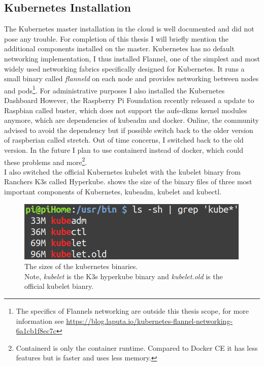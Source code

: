 \subsection{Kubernetes Installation}
The Kubernetes master installation in the cloud is well documented and did not pose any trouble. For completion of this thesis I will briefly mention the additional components installed on the master. Kubernetes has no default networking implementation, I thus installed Flannel\cite{coreosFlannel:online}, one of the simplest and most widely used networking fabrics specifically designed for Kubernetes. It runs a small binary called \textit{flanneld} on each node and provides networking between nodes and pods\footnote{The specifics of Flannels networking are outside this thesis scope, for more information see \url{https://blog.laputa.io/kubernetes-flannel-networking-6a1cb1f8ec7c}}. For administrative purposes I also installed the Kubernetes Dashboard However, the Raspberry Pi Foundation recently released a update to Raspbian called buster, which does not support the aufs-dkms kernel modules anymore, which are dependencies of kubeadm and docker. Online, the community advised to avoid the dependency but if possible switch back to the older version of raspberian called stretch. Out of time concerns, I switched back to the old version. In the future I plan to use containerd instead of docker, which could these problems and more\footnote{Containerd is only the container runtime. Compared to Docker CE it has less features but is faster and uses less memory.}.\\
I also switched the official Kubernetes kubelet with the kubelet binary from Ranchers K3s called Hyperkube.  shows the size of the binary files of three most important components of Kubernetes, kubeadm, kubelet and kubectl.
\begin{figure}[h!]
    \centering
    \includegraphics[scale=0.5]{figures/kubeBinariesSize.png}
    \vspace*{-0.3cm}
    \caption{The sizes of the kubernetes binaries.\\ Note, \textit{kubelet} is the K3s hyperkube binary and \textit{kubelet.old} is the official kubelet bianry.}
    \label{fig:kubeBinaries}
\end{figure}
